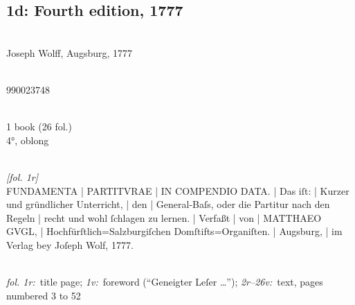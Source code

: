 \documentclass[abbrwidth=7em,shorttitlesize=55]{ees}
\begin{document}
\clearpage
\subsection{1d: Fourth edition, 1777}

\\
Joseph Wolff, Augsburg, 1777

\\
990023748

\\
1 book (26 fol.)\\
4°, oblong

\\
\textit{[fol. 1r]}\\
FUNDAMENTA | PARTITVRAE | IN COMPENDIO DATA. | Das iſt: | Kurzer und gründlicher Unterricht, | den | General-Baſs, oder die Partitur nach den Regeln | recht und wohl ſchlagen zu lernen. | Verfaßt | von | MATTHAEO GVGL, | Hochfürſtlich=Salzburgiſchen Domſtifts=Organiſten. | Augsburg, | im Verlag bey Joſeph Wolf, 1777.

\\
\textit{fol. 1r:}~title page; \textit{1v:}~foreword (“Geneigter Leſer …”); \textit{2r–26v:}~text, pages numbered 3 to 52
\end{document}
